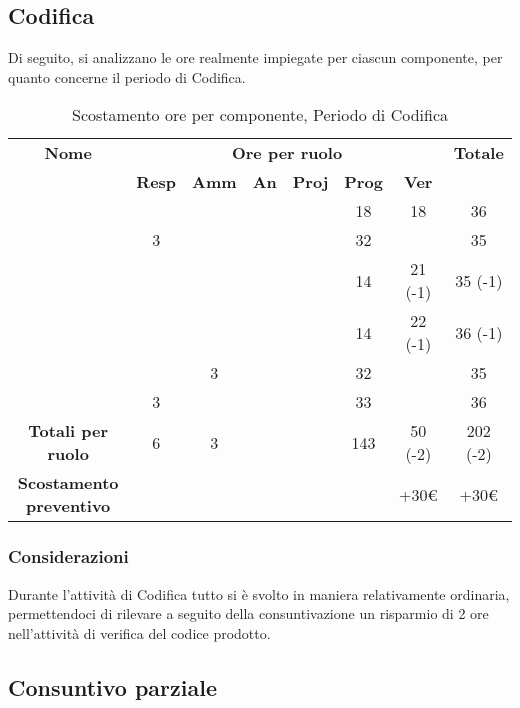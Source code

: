 \newpage
\subsection{Codifica}

Di seguito, si analizzano le ore realmente impiegate per ciascun componente, per quanto concerne il periodo di Codifica.

\begin{table}[H]
	\begin{center}
		\begin{tabular}{|c|c|c|c|c|c|c|c|}
			\hline
			\textbf{Nome} & \multicolumn{6}{c|}{\textbf{Ore per ruolo}} & \textbf{Totale} \\\cline{2-7}
			& \textbf{Resp} & \textbf{Amm} & \textbf{An} & \textbf{Proj} & \textbf{Prog} & \textbf{Ver} & \\
			\hline
			\MC			&		&		&		&		&	18	&	18	&	36	\\
			\hline
			\AN			&	3	&		&		&	 	&	32	&		& 	35	\\
			\hline
			\DAN		&		&		&		&		&	14	&	21 (-1)	&	35 (-1)	\\
			\hline
			\AS			&		&	 	&	 	&		&	14 	& 	22 (-1)	&	36	(-1)\\
			\hline
			\NS 		&		&	3	&		&		&	32	& 		&	35	\\
			\hline
			\DS			& 	3	&		&		&		&	33	&		&	36	\\
			\hline
			\textbf{Totali per ruolo}	& 	6 	&	3 	&		&		&	143	&	50 (-2) 	&	202 (-2)	\\
			\hline
			\textbf{Scostamento preventivo}	& 		&		&		&		&		&	+30€	&	+30€	\\
			\hline
		\end{tabular}
	\end{center}
	\caption{Scostamento ore per componente, Periodo di Codifica}
\end{table}

\subsubsection{Considerazioni}
Durante l'attività di Codifica tutto si è svolto in maniera relativamente ordinaria, permettendoci di rilevare a seguito della consuntivazione un risparmio di 2 ore nell'attività di verifica del codice prodotto. 

\newpage
\subsection{Consuntivo parziale}

